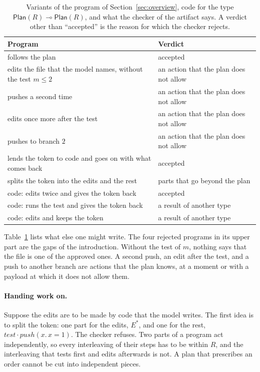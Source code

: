 \documentclass[acmsmall,nonacm,screen]{acmart}
\newcommand{\kw}[1]{\mathsf{#1}}
\newcommand{\nm}[1]{\mathit{#1}}
\newcommand{\Plan}[1]{\kw{Plan}(#1)}
\newcommand{\test}{\nm{test}}
\newcommand{\push}{\nm{push}}
\begin{document}
\begin{table}[t]
\caption{Variants of the program of Section~\ref{sec:overview}, code for the type
$\Plan{R} \multimap \Plan{R}$, and what the checker of the artifact says. A verdict other
than ``accepted'' is the reason for which the checker rejects.}
\label{tab:verdicts}
\small
\begin{tabular}{@{}ll@{}}
\toprule
Program & Verdict \\
\midrule
follows the plan & accepted \\
edits the file that the model names, without the test $m \le 2$ & an action that the plan does not allow \\
pushes a second time & an action that the plan does not allow \\
edits once more after the test & an action that the plan does not allow \\
pushes to branch $2$ & an action that the plan does not allow \\
lends the token to code and goes on with what comes back & accepted \\
splits the token into the edits and the rest & parts that go beyond the plan \\
\midrule
code: edits twice and gives the token back & accepted \\
code: runs the test and gives the token back & a result of another type \\
code: edits and keeps the token & a result of another type \\
\bottomrule
\end{tabular}
\end{table}

Table~\ref{tab:verdicts} lists what else one might write. The four rejected programs in its
upper part are the gaps of the introduction. Without the test of $m$, nothing says that the
file is one of the approved ones. A second push, an edit after the test, and a push to
another branch are actions that the plan knows, at a moment or with a payload at which it
does not allow them.

\paragraph{Handing work on.} Suppose the edits are to be made by code that the model writes.
The first idea is to split the token: one part for the edits, $E^{*}$, and one for the rest,
$\test \cdot \push(x.\,x = 1)$. The checker refuses. Two parts of a program act
independently, so every interleaving of their steps has to be within $R$, and the
interleaving that tests first and edits afterwards is not. A plan that prescribes an order
cannot be cut into independent pieces.
\end{document}
